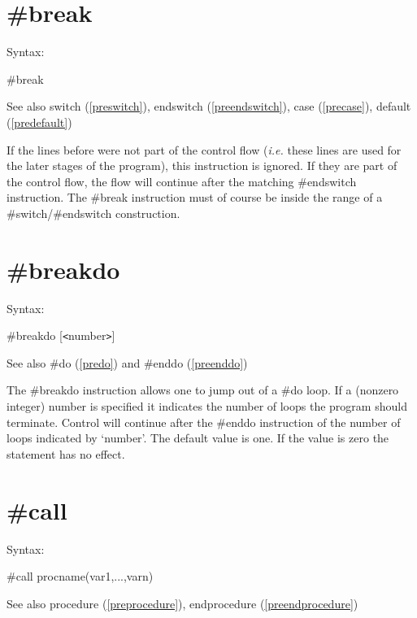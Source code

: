 
\section{\#break}
\label{prebreak}

\noindent Syntax:

\#break
 
\noindent See also switch (\ref{preswitch}),
        endswitch (\ref{preendswitch}),
        case (\ref{precase}),
        default (\ref{predefault})

\noindent If the lines before were not part of the control 
flow ({\it i.e.} these lines are used for the later stages of the program), 
this instruction is ignored. If they are part of the control flow, the flow 
will continue after the matching \#endswitch 
instruction. The \#break instruction must of course be inside the range of 
a \#switch/\#endswitch construction.

 
\section{\#breakdo}
\label{prebreakdo}

\noindent Syntax:

\#breakdo [{\tt<}number{\tt>}]

\noindent See also \#do (\ref{predo}) and \#enddo (\ref{preenddo})

\noindent The \#breakdo instruction allows one to jump out 
of a \#do loop. If a (nonzero integer) number is specified it indicates the 
number of loops the program should terminate. Control will continue after 
the \#enddo instruction of the number of loops indicated by `number'. 
The default value is one. If the value is zero the statement has no effect.


\section{\#call}
\label{precall}

\noindent Syntax:

\#call procname(var1,...,varn)
 
\noindent See also procedure (\ref{preprocedure}), endprocedure
(\ref{preendprocedure})

